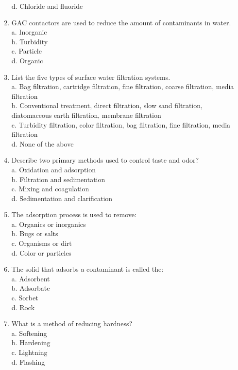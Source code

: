 \begin{enumerate}
d. Chloride and fluoride\\
\item GAC contactors are used to reduce the amount of contaminants in water.\\
a. Inorganic\\
b. Turbidity\\
c. Particle\\
d. Organic\\
\item List the five types of surface water filtration systems.\\
a. Bag filtration, cartridge filtration, fine filtration, coarse filtration, media filtration\\
b. Conventional treatment, direct filtration, slow sand filtration, diatomaceous earth filtration, membrane filtration\\
c. Turbidity filtration, color filtration, bag filtration, fine filtration, media filtration\\
d. None of the above\\
\item Describe two primary methods used to control taste and odor?\\
a. Oxidation and adsorption\\
b. Filtration and sedimentation\\
c. Mixing and coagulation\\
d. Sedimentation and clarification\\
\item The adsorption process is used to remove:\\
a. Organics or inorganics\\
b. Bugs or salts\\
c. Organisms or dirt\\
d. Color or particles\\
\item The solid that adsorbs a contaminant is called the:\\
a. Adsorbent\\
b. Adsorbate\\
c. Sorbet\\
d. Rock\\
\item What is a method of reducing hardness?\\
a. Softening\\
b. Hardening\\
c. Lightning\\
d. Flashing\\

\end{enumerate}
